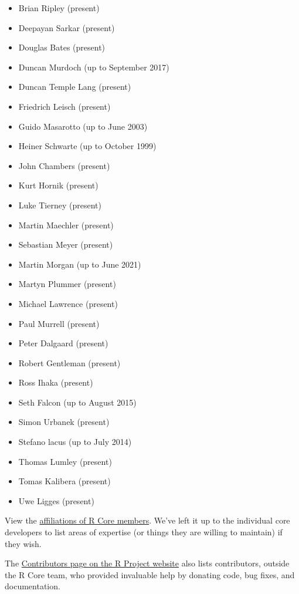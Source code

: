 \documentclass[
  letterpaper,
  DIV=11,
  numbers=noendperiod]{scrreprt}
\providecommand{\tightlist}{%
  \setlength{\itemsep}{0pt}\setlength{\parskip}{0pt}}\usepackage{longtable,booktabs,array}
\begin{document}
\begin{itemize}
\tightlist
\item
  Brian Ripley (present)
\item
  Deepayan Sarkar (present)
\item
  Douglas Bates (present)
\item
  Duncan Murdoch (up to September 2017)
\item
  Duncan Temple Lang (present)
\item
  Friedrich Leisch (present)
\item
  Guido Masarotto (up to June 2003)
\item
  Heiner Schwarte (up to October 1999)
\item
  John Chambers (present)
\item
  Kurt Hornik (present)
\item
  Luke Tierney (present)
\item
  Martin Maechler (present)
\item
  Sebastian Meyer (present)
\item
  Martin Morgan (up to June 2021)
\item
  Martyn Plummer (present)
\item
  Michael Lawrence (present)
\item
  Paul Murrell (present)
\item
  Peter Dalgaard (present)
\item
  Robert Gentleman (present)
\item
  Ross Ihaka (present)
\item
  Seth Falcon (up to August 2015)
\item
  Simon Urbanek (present)
\item
  Stefano lacus (up to July 2014)
\item
  Thomas Lumley (present)
\item
  Tomas Kalibera (present)
\item
  Uwe Ligges (present)
\end{itemize}

View the \href{}{affiliations of R Core members}. We've left it up to
the individual core developers to list areas of expertise (or things
they are willing to maintain) if they wish.

The \href{https://www.r-project.org/contributors.html}{Contributors page
on the R Project website} also lists contributors, outside the R Core
team, who provided invaluable help by donating code, bug fixes, and
documentation.

\end{document}
